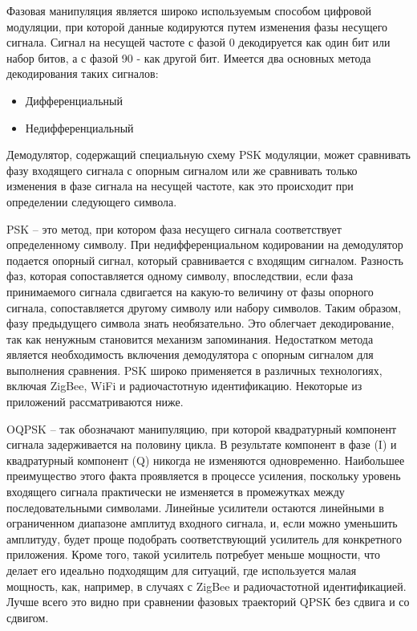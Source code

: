 \documentclass[a4paper,12pt]{article}
\begin{document}
Фазовая манипуляция является широко используемым способом цифровой модуляции, при которой данные кодируются путем изменения фазы несущего сигнала. Сигнал на несущей частоте с фазой 0 декодируется как один бит или набор битов, а с фазой 90 - как другой бит. Имеется два основных метода декодирования таких сигналов:
\begin{itemize}
 \item Дифференциальный 
 \item Недифференциальный
\end{itemize}

Демодулятор, содержащий специальную схему PSK модуляции, может сравнивать фазу входящего сигнала с опорным сигналом или же сравнивать только изменения в фазе сигнала на несущей частоте, как это происходит при определении следующего символа.

PSK – это метод, при котором фаза несущего сигнала соответствует определенному символу. При недифференциальном кодировании на демодулятор подается опорный сигнал, который сравнивается с входящим сигналом. Разность фаз, которая сопоставляется одному символу, впоследствии, если фаза принимаемого сигнала сдвигается на какую-то величину от фазы опорного сигнала, сопоставляется другому символу или набору символов. Таким образом, фазу предыдущего символа знать необязательно. Это облегчает декодирование, так как ненужным становится механизм запоминания. Недостатком метода является необходимость включения демодулятора с опорным сигналом для выполнения сравнения. PSK широко применяется в различных технологиях, включая ZigBee, WiFi и радиочастотную идентификацию. Некоторые из приложений рассматриваются ниже.

OQPSK – так обозначают манипуляцию, при которой квадратурный компонент сигнала задерживается на половину цикла. В результате компонент в фазе (I) и квадратурный компонент (Q) никогда не изменяются одновременно. Наибольшее преимущество этого факта проявляется в процессе усиления, поскольку уровень входящего сигнала практически не изменяется в промежутках между последовательными символами. Линейные усилители остаются линейными в ограниченном диапазоне амплитуд входного сигнала, и, если можно уменьшить амплитуду, будет проще подобрать соответствующий усилитель для конкретного приложения. Кроме того, такой усилитель потребует меньше мощности, что делает его идеально подходящим для ситуаций, где используется малая мощность, как, например, в случаях с ZigBee и радиочастотной идентификацией. Лучше всего это видно при сравнении фазовых траекторий QPSK без сдвига и со сдвигом.
\end{document}
